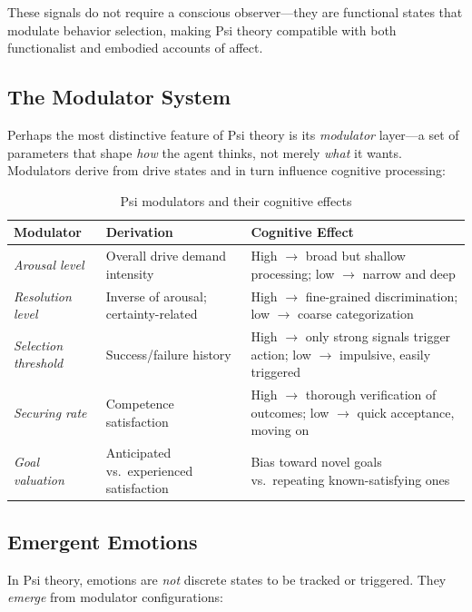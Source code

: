 \documentclass[11pt,letterpaper]{article}
\begin{document}
These signals do not require a conscious observer---they are functional states
that modulate behavior selection, making Psi theory compatible with both
functionalist and embodied accounts of affect.

\subsection{The Modulator System}
\label{sec:modulators}

Perhaps the most distinctive feature of Psi theory is its \emph{modulator}
layer---a set of parameters that shape \emph{how} the agent thinks, not
merely \emph{what} it wants. Modulators derive from drive states and in turn
influence cognitive processing:

\begin{table}[H]
\centering
\small\sffamily
\caption{Psi modulators and their cognitive effects}
\label{tab:modulators}
\begin{tabularx}{\textwidth}{l X X}
\toprule
\textbf{Modulator} & \textbf{Derivation} & \textbf{Cognitive Effect} \\
\midrule
\textit{Arousal level} &
  Overall drive demand intensity &
  High $\rightarrow$ broad but shallow processing; low $\rightarrow$ narrow
  and deep \\
\textit{Resolution level} &
  Inverse of arousal; certainty-related &
  High $\rightarrow$ fine-grained discrimination; low $\rightarrow$ coarse
  categorization \\
\textit{Selection threshold} &
  Success/failure history &
  High $\rightarrow$ only strong signals trigger action; low $\rightarrow$
  impulsive, easily triggered \\
\textit{Securing rate} &
  Competence satisfaction &
  High $\rightarrow$ thorough verification of outcomes; low $\rightarrow$
  quick acceptance, moving on \\
\textit{Goal valuation} &
  Anticipated vs.\ experienced satisfaction &
  Bias toward novel goals vs.\ repeating known-satisfying ones \\
\bottomrule
\end{tabularx}
\end{table}

\subsection{Emergent Emotions}

In Psi theory, emotions are \emph{not} discrete states to be tracked or
triggered. They \emph{emerge} from modulator configurations:
\end{document}
